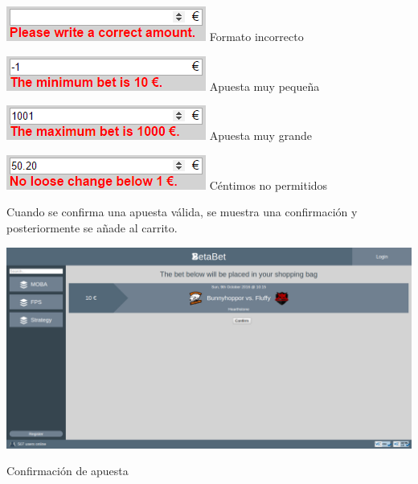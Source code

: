 \documentclass{article}
\begin{document}
\begin{multicols}{4}
    \begin{center}
        \includegraphics[width=.975\linewidth]{bet1}
        Formato incorrecto
    \end{center}
    \columnbreak
    \begin{center}
        \includegraphics[width=.975\linewidth]{bet2}
        Apuesta muy pequeña
    \end{center}
    \columnbreak
    \begin{center}
        \includegraphics[width=.975\linewidth]{bet3}
        Apuesta muy grande
    \end{center}
    \columnbreak
    \begin{center}
        \includegraphics[width=.975\linewidth]{bet4}
        Céntimos no permitidos
    \end{center}
\end{multicols}
Cuando se confirma una apuesta válida, se muestra una confirmación y posteriormente se añade al carrito.
\smallskip\newline
\begin{minipage}{\linewidth}
    \centering
    \captionsetup{type=figure}
    \includegraphics[width=\linewidth]{fig6}
    \caption{Confirmación de apuesta}
    \label{fig:fig6}
\end{minipage}
\newpage
\end{document}
